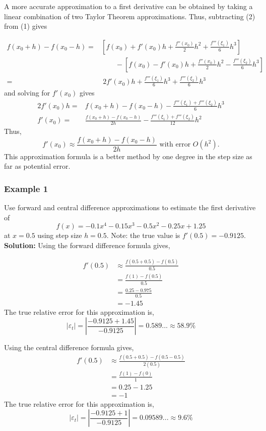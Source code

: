 \documentclass [titlepage,12pt,letter] {article}
\begin{document}
A more accurate approximation to a first derivative can be obtained by taking a linear combination of two Taylor Theorem approximations. Thus, subtracting (2) from (1) gives 

\begin{align*}
f(x_0+h)-f(x_0-h)=&\left[f(x_0) + f'(x_0)h + \frac{f''(x_0)}{2}h^2 + \frac{f'''(\xi_1)}{6}h^3 \right] \\
 &~~~~~~~~~ -\left[f(x_0) - f'(x_0)h + \frac{f''(x_0)}{2}h^2 - \frac{f'''(\xi_2)}{6}h^3 \right] \\
=& ~2f'(x_0)h+\frac{f'''(\xi_1)}{6}h^3+\frac{f'''(\xi_2)}{6}h^3
\end{align*}
and solving for $f'(x_0)$ gives
\begin{align*}
2f'(x_0)h=&f(x_0+h)-f(x_0-h)-\frac{f'''(\xi_1)+f'''(\xi_2)}{6}h^3 \\
f'(x_0)=&\frac{f(x_0+h)-f(x_0-h)}{2h}-\frac{f'''(\xi_1)+f'''(\xi_2)}{12}h^2
\end{align*}
Thus,
\[
\boxed{f'(x_0) \approx \frac{f(x_0+h) - f(x_0-h)}{2h}} \text{ with error } O(h^2).
\]
This approximation formula is a better method by one degree in the step size as far as potential error.

\subsubsection{ Example 1} Use forward and central difference approximations to estimate the first derivative of
\[
f(x)=-0.1x^4-0.15x^3-0.5x^2-0.25x+1.25
\]
at $x=0.5$ using step size $h=0.5$. Note: the true value is $f'(0.5)=-0.9125$.
\\

\noindent
{\bf Solution:} Using the forward difference formula gives,

\begin{align*}
f'(0.5) &\approx \frac{f(0.5+0.5)-f(0.5)}{0.5} \\
&=\frac{f(1)-f(0.5)}{0.5}\\
&=\frac{0.25-0.975}{0.5}\\
&=-1.45
\end{align*}
The true relative error for this approximation is,
\[
|\varepsilon_t|=\left|\frac{-0.9125+1.45}{-0.9125}\right|=0.589...\approx58.9\%
\]

Using the central difference formula gives,
\begin{align*}
f'(0.5) &\approx \frac{f(0.5+0.5)-f(0.5-0.5)}{2(0.5)} \\
&=\frac{f(1)-f(0)}{1}\\
&=0.25-1.25\\
&=-1
\end{align*}
The true relative error for this approximation is,
\[
|\varepsilon_t|=\left|\frac{-0.9125+1}{-0.9125}\right|=0.09589...\approx9.6\%
\]
\end{document}
